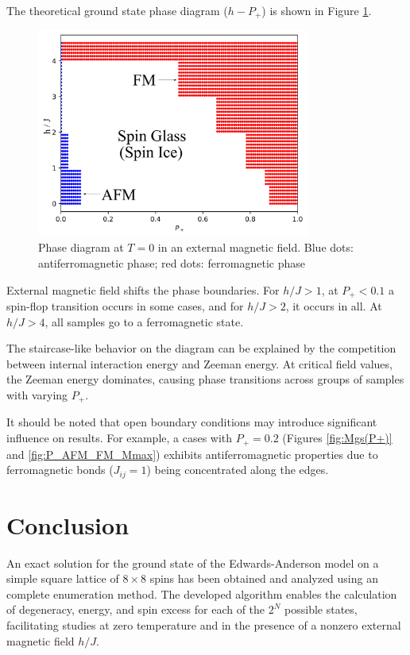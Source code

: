 \documentclass[preprint,12pt]{elsarticle}
\begin{document}
The theoretical ground state phase diagram ($h-P_+$) is shown in Figure \ref{fig:P+_afm_fm(H)}.

\begin{figure}[H]
	\centering
	\includegraphics[width=0.8\textwidth]{images/P+_afm_fm(H)_filled.png}
	\caption{Phase diagram at $T = 0$ in an external magnetic field. Blue dots: antiferromagnetic phase; red dots: ferromagnetic phase}
	\label{fig:P+_afm_fm(H)}
\end{figure}

External magnetic field shifts the phase boundaries. For $h/J > 1$, at $P_+ < 0.1$ a spin-flop transition occurs in some cases, and for $h/J > 2$, it occurs in all. At $h/J > 4$, all samples go to a ferromagnetic state.

The staircase-like behavior on the diagram can be explained by the competition between internal interaction energy and Zeeman energy. At critical field values, the Zeeman energy dominates, causing phase transitions across groups of samples with varying $P_+$.

It should be noted that open boundary conditions may introduce significant influence on results. For example, a cases with $P_+ = 0.2$ (Figures \ref{fig:Mgs(P+)} and \ref{fig:P_AFM_FM_Mmax}) exhibits antiferromagnetic properties due to ferromagnetic bonds ($J_{ij} = 1$) being concentrated along the edges.

\section{Conclusion}

An exact solution for the ground state of the Edwards-Anderson model on a simple square lattice of $8 \times 8$ spins has been obtained and analyzed using an complete enumeration method. The developed algorithm enables the calculation of degeneracy, energy, and spin excess for each of the $2^N$ possible states, facilitating studies at zero temperature and in the presence of a nonzero external magnetic field $h/J$.
\end{document}
